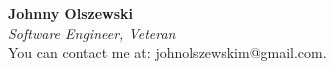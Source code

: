 \documentclass{article}
\makeatletter
\newcommand{\name}{\textcolor{myblue}{Johnny Olszewski}}
\newcommand{\hook}{\textcolor{mygreen}{Software Engineer, Veteran}}
\newcommand{\email}{\textcolor{myred}{johnolszewskim@gmail.com}}
\makeatother
\begin{document}
\textbf{\name} \\ 
\textit{\hook} \\ 
You can contact me at: \email.
\end{document}
